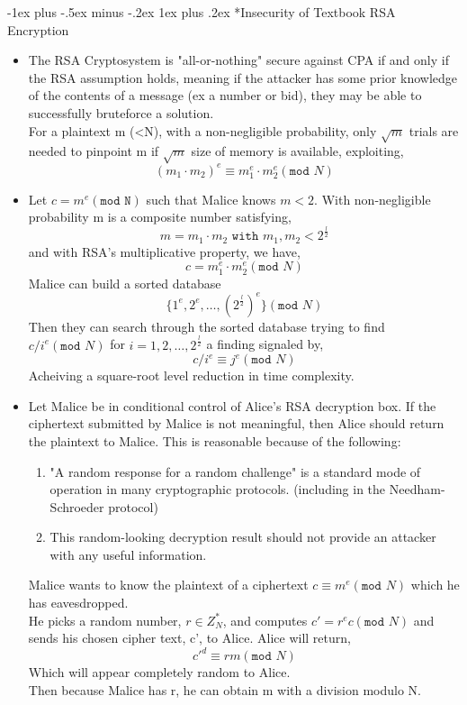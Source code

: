 \documentclass[3pt,landscape]{article}
\makeatletter
\renewcommand{\subsubsection}{\@startsection{subsubsection}{3}{0mm}%
                            {-1ex plus -.5ex minus -.2ex}%
                            {1ex plus .2ex}%
                            {\normalfont\small\bfseries}}
\makeatother
\begin{document}
\begin{multicols}{3}
\subsubsection*{Insecurity of Textbook RSA Encryption}
\begin{itemize}
    \item The RSA Cryptosystem is "all-or-nothing" secure against CPA if and only if the RSA assumption holds, meaning if the attacker has some prior knowledge of the contents of a message (ex a number or bid), they may be able to successfully bruteforce a solution.\\
        \vspace{2 mm}
        For a plaintext m (\textless N), with a non-negligible probability, only \(\sqrt{m}\) trials are needed to pinpoint m if \(\sqrt{m}\) size of memory is available, exploiting,
        \[(m_{1}\cdot m_{2})^{e} \equiv m_{1}^{e} \cdot m_{2}^{e} (\texttt{mod }N)\]
    \item Let \(c = m^{e}(\texttt{mod N})\) such that Malice knows \(m<2\). With non-negligible probability m is a composite number satisfying,
        \[m = m_{1} \cdot m_{2} \texttt{ with } m_{1},m_{2} < 2^{\frac{l}{2}}\]
        and with RSA's multiplicative property, we have,
        \[c = m_{1}^{e} \cdot m_{2}^{e}(\texttt{mod }N)\]
        Malice can build a sorted database
        \[\{1^{e},2^{e},\ldots,(2^{\frac{l}{2}})^{e}\}(\texttt{mod }N)\]
        Then they can search through the sorted database trying to find \(c/i^{e}(\texttt{mod }N)\) for \(i=1,2,\ldots,2^{\frac{l}{2}}\) a finding signaled by,
        \[c/i^{e} \equiv j^{e}(\texttt{mod }N)\]
        Acheiving a square-root level reduction in time complexity.
    \item Let Malice be in conditional control of Alice's RSA decryption box. If the ciphertext submitted by Malice is not meaningful, then Alice should return the plaintext to Malice. This is reasonable because of the following:
        \begin{enumerate}
            \item "A random response for a random challenge" is a standard mode of operation in many cryptographic protocols. (including in the Needham-Schroeder protocol)
            \item This random-looking decryption result should not provide an attacker with any useful information.
        \end{enumerate}
        Malice wants to know the plaintext of a ciphertext \(c \equiv m^{e}(\texttt{mod }N)\) which he has eavesdropped.\\
        \vspace{2 mm}
        He picks a random number, \(r \in Z^{*}_{N}\), and computes \(c'=r^{e}c(\texttt{mod }N)\) and sends his chosen cipher text, c', to Alice. Alice will return,
        \[c'^{d} \equiv rm(\texttt{mod }N)\]
        Which will appear completely random to Alice.\\
        Then because Malice has r, he can obtain m with a division modulo N.
\end{itemize}


\end{multicols}
\end{document}
